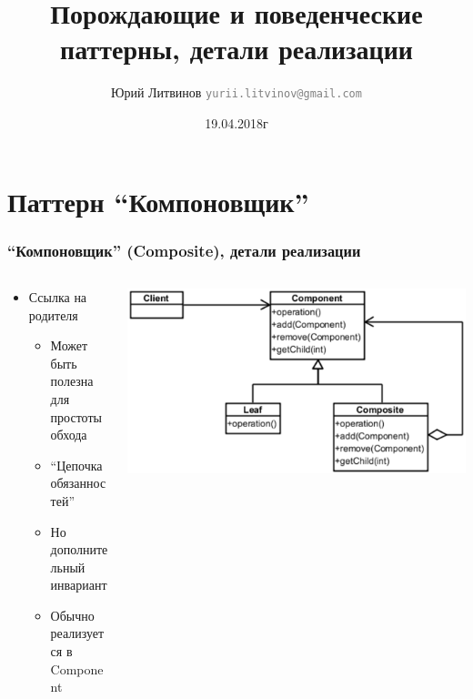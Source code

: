 \documentclass[xetex,mathserif,serif]{beamer}
\title{Порождающие и поведенческие паттерны, детали реализации}
\author[Юрий Литвинов]{Юрий Литвинов \newline \textcolor{gray}{\small\texttt{yurii.litvinov@gmail.com}}}
\date{19.04.2018г}
\begin{document}
	
	\frame{\titlepage}

	\section{Паттерн ``Компоновщик''}

	\begin{frame}
		\frametitle{``Компоновщик'' (Composite), детали реализации}
		\begin{columns}
			\begin{column}{0.6\textwidth}
				\begin{itemize}
					\item Ссылка на родителя
					\begin{itemize}
						\item Может быть полезна для простоты обхода
						\item ``Цепочка обязанностей''
						\item Но дополнительный инвариант
						\item Обычно реализуется в Component
					\end{itemize}
				\end{itemize}
			\end{column}
			\begin{column}{0.4\textwidth}
				\begin{center}
					\includegraphics[width=\textwidth]{composite.png}
				\end{center}
			\end{column}
		\end{columns}


\end{frame}
\end{document}
